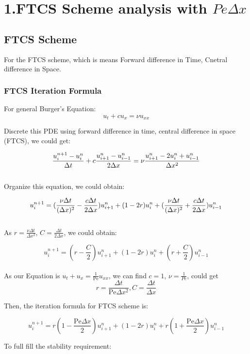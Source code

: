 \documentclass[12pt]{article}
\begin{document}
\section{1.FTCS Scheme analysis with $Pe\Delta x$}
\subsection{FTCS Scheme}

For the FTCS scheme, which is means Forward difference in Time,
Cnetral difference in Space. 

\subsubsection{FTCS Iteration Formula}

For general Burger's Equation:
$$
u_t + cu_x = {\nu} u_{xx}
$$

Discrete this PDE using forward difference in time,
central difference in space (FTCS), we could get:

$$
\frac{u_i^{n+1} - u_i^n}{\Delta t} + c \frac{u_{i+1}^n - u_{i-1}^n}{2\Delta x} = \nu \frac{u_{i+1}^n - 2u_i^n + u_{i-1}^n}{\Delta x^2} \\
$$\\

Organize this equation, we could obtain:

$$
u_i^{n+1} = (\frac{\nu \Delta t}{(\Delta x)^2} - \frac{c\Delta t}{2\Delta x})u_{i+1}^n + (1-2r)u_i^n + (\frac{\nu \Delta t}{(\Delta x)^2}  + \frac{c\Delta t}{2\Delta x})u_{i-1}^n \\
$$\\

As \( r = \frac{\nu \Delta t}{\Delta x^2} \), \( C = \frac{\Delta t}{2\Delta x} \),
we could obtain:

$$
u_i^{n+1} = (r - \frac{C}{2})u_{i+1}^n + (1-2r)u_i^n +  (r + \frac{C}{2})u_{i-1}^n
$$\\

As our Equation is \( u_t + u_x = \frac{1}{\text{Pe}} u_{xx} \), 
we can find \( c = 1 \),
$\nu = \frac{1}{Pe}$,
could get 
 $$ r = \frac{\Delta t}{\text{Pe}\Delta x^2} , C = \frac{\Delta t}{\Delta x} $$

Then, the iteration formula for FTCS scheme is:

$$
u_i^{n+1} = r(1 - \frac{\text{Pe}\Delta x}{2})u_{i+1}^n + (1-2r)u_i^n + r (1 + \frac{\text{Pe}\Delta x}{2})u_{i-1}^n
$$



To full fill the stability requirement:
\end{document}

